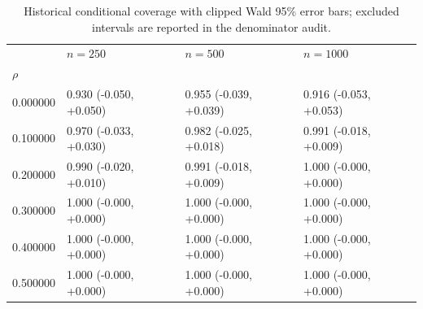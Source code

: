 \begin{table}
\caption{Historical conditional coverage with clipped Wald 95\% error bars; excluded intervals are reported in the denominator audit.}
\label{tab:experiment_details_reverse_triangle_coverage_main}
\begin{tabular}{llll}
\toprule
 & $n=250$ & $n=500$ & $n=1000$ \\
$\rho$ &  &  &  \\
\midrule
0.000000 & 0.930 (-0.050, +0.050) & 0.955 (-0.039, +0.039) & 0.916 (-0.053, +0.053) \\
0.100000 & 0.970 (-0.033, +0.030) & 0.982 (-0.025, +0.018) & 0.991 (-0.018, +0.009) \\
0.200000 & 0.990 (-0.020, +0.010) & 0.991 (-0.018, +0.009) & 1.000 (-0.000, +0.000) \\
0.300000 & 1.000 (-0.000, +0.000) & 1.000 (-0.000, +0.000) & 1.000 (-0.000, +0.000) \\
0.400000 & 1.000 (-0.000, +0.000) & 1.000 (-0.000, +0.000) & 1.000 (-0.000, +0.000) \\
0.500000 & 1.000 (-0.000, +0.000) & 1.000 (-0.000, +0.000) & 1.000 (-0.000, +0.000) \\
\bottomrule
\end{tabular}
\end{table}
